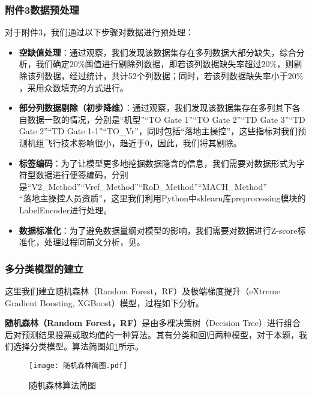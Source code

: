\documentclass{MathorCupModeling}
\begin{document}
	\subsubsection{附件3数据预处理}
	对于附件3，我们通过以下步骤对数据进行预处理：
	\begin{itemize}
		\item \textbf{空缺值处理}：通过观察，我们发现该数据集存在多列数据大部分缺失，综合分析，我们确定$20\%$阈值进行剔除列数据，即若该列数据缺失率超过$20\%$，则剔除该列数据，经过统计，共计52个列数据；同时，若该列数据缺失率小于$20\%$，采用众数填充的方式进行。
		\item \textbf{部分列数据剔除（初步降维）}：通过观察，我们发现该数据集存在多列其下各自数据一致的情况，分别是“机型”“TO Gate 1”“TO Gate 2”“TD Gate 3”“TD Gate 2”“TD Gate 1-1”“TO\_Vr”，同时包括“落地主操控”，这些指标对我们预测机组飞行技术影响很小，趋近于0，因此，我们将其剔除。
		\item \textbf{标签编码}：为了让模型更多地挖掘数据隐含的信息，我们需要对数据形式为字符型数据进行便签编码，分别是“V2\_Method”“Vref\_Method”“RoD\_Method”“MACH\_Method”\\“落地主操控人员资质”，这里我们利用Python中sklearn库preprocessing模块的LabelEncoder进行处理。
		\item \textbf{数据标准化}：为了避免数据量纲对模型的影响，我们需要对数据进行Z-score标准化，处理过程同前文分析，见\textcolor{blue}{}。
	\end{itemize}
	\subsubsection{多分类模型的建立}\label{RF-XGBoost}
	这里我们建立随机森林（Random Forest，RF）及极端梯度提升（eXtreme Gradient Boosting, XGBoost）模型，过程如下分析。
	
	\textbf{随机森林（Random Forest，RF）}是由多棵决策树（Decision Tree）进行组合后对预测结果投票或取均值的一种算法\textcolor{blue}{\cite{Paper:随机森林}}。其有分类和回归两种模型，对于本题，我们选择分类模型。算法简图如\textcolor{blue}{\cref{fig:随机森林简图}}所示。
	\begin{figure}[H]
		\centering
		\texttt{[image: 随机森林简图.pdf]}
		\caption{随机森林算法简图}
		\label{fig:随机森林简图}
	\end{figure}
\end{document}
